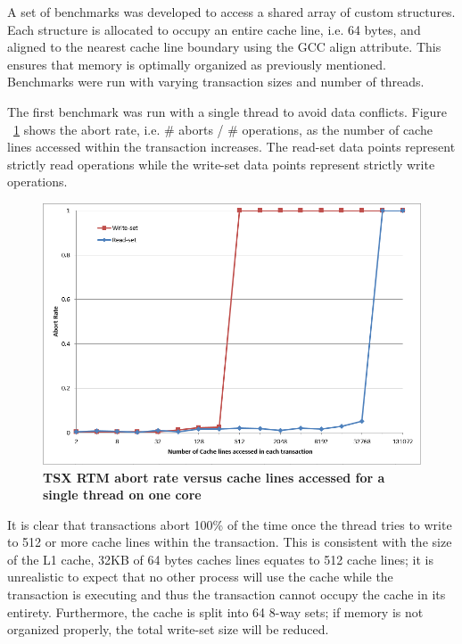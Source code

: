 \documentclass[a4paper]{article}
\begin{document}
\indent
A set of benchmarks was developed to access a shared array of custom structures. Each
structure is allocated to occupy an entire cache line, i.e. 64 bytes, and
aligned to the nearest cache line boundary using the GCC align attribute.  This
ensures that memory is optimally organized as previously mentioned.  Benchmarks
were run with varying transaction sizes and number of threads.
\par

\indent
The first benchmark was run with a single thread to avoid data conflicts.  Figure
~\ref{fig:trx_size} shows the abort rate, i.e. \# aborts / \# operations, as the
number of cache lines accessed within the transaction increases.  The read-set
data points represent strictly read operations while the write-set data points
represent strictly write operations.
\par 

\begin{figure}[H]
    \centering
    \graphicspath{ {./figures/} }
    \includegraphics[totalheight=0.50\textheight,keepaspectratio]{trx_size}
    \caption{\textbf{TSX RTM abort rate versus cache lines accessed for a single
    thread on one core}}
    \label{fig:trx_size}
\end{figure}

\indent
It is clear that transactions abort 100\% of the time once the thread tries to
write to 512 or more cache lines within the transaction.  This is consistent
with the size of the L1 cache, 32KB of 64 bytes caches lines equates to 512
cache lines; it is unrealistic to expect that no other process will use the
cache while the transaction is executing and thus the transaction cannot occupy
the cache in its entirety.  Furthermore, the cache is split into 64 8-way sets;
if memory is not organized properly, the total write-set size will be reduced.
\par
\end{document}
